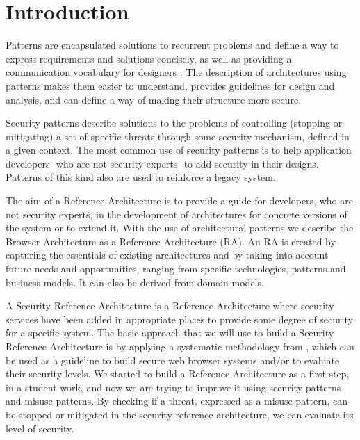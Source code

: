 \documentclass{sig-alternate-05-2015}
\begin{document}





\section*{Introduction}
Patterns are encapsulated solutions to recurrent problems and define a way to express requirements and solutions concisely, as well as providing a communication vocabulary for designers \cite{gamma1994design}. The description of architectures using patterns makes them easier to understand, provides guidelines for design and analysis, and can define a way of making their structure more secure.

Security patterns describe solutions to the problems of controlling (stopping or mitigating) a set of specific threats through some security mechanism, defined in a given context. The most common use of security patterns is to help application developers -who are not security experts- to add security in their designs. Patterns of this kind also are used to reinforce a legacy system.

The aim of a Reference Architecture is to provide a guide for developers, who are not security experts, in the development of architectures for concrete versions of the system or to extend it. With the use of architectural patterns we describe the Browser Architecture as a Reference Architecture (RA). An RA is created by capturing the essentials of existing architectures and by taking into account future needs and opportunities, ranging from specific technologies, patterns and business models. It can also be derived from domain models.

A Security Reference Architecture is a Reference Architecture where security services have been added in appropriate places to provide some degree of security for a specific system. The basic approach that we will use to build a Security Reference Architecture is by applying a systematic methodology from \cite{fernandez2006methodology,Fernandez2011,fernandez2014security}, which can be used as a guideline to build secure web browser systems and/or to evaluate their security levels. We started to build a Reference Architecture as a first step, in a student work, and now we are trying to improve it using security patterns and misuse patterns. By checking if a threat, expressed as a misuse pattern, can be stopped or mitigated in the security reference architecture, we can evaluate its level of security.
\end{document}
